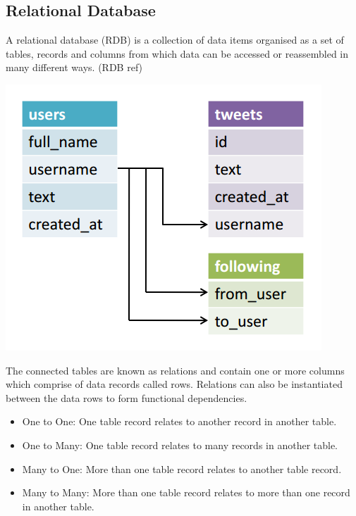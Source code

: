 \subsection{Relational Database}
A relational database (RDB) is a collection of data items organised as a set of tables, records and columns from which data can be accessed or reassembled in many different ways. (RDB ref)  \begin{center}\includegraphics[width=0.75\linewidth]{images/rdbmsmodel}\end{center}The connected tables are known as relations and contain one or more columns which comprise of data records called rows. Relations can also be instantiated between the data rows to form functional dependencies.

\begin{itemize}
\item One to One: One table record relates to another record in another table.
\item One to Many: One table record relates to many records in another table.
\item Many to One: More than one table record relates to another table record.
\item Many to Many: More than one table record relates to more than one record in another table.
\end{itemize}




